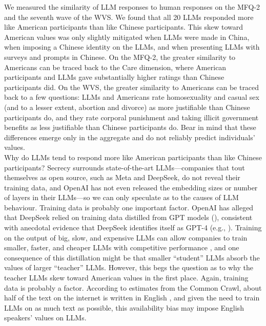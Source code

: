 \documentclass[11pt,a4paper]{article}
\begin{document}
We measured the similarity of LLM responses to human responses on the MFQ-2 and the seventh wave of the WVS. We found that all 20 LLMs responded more like American participants than like Chinese participants. This skew toward American values was only slightly mitigated when LLMs were made in China, when imposing a Chinese identity on the LLMs, and when presenting LLMs with surveys and prompts in Chinese. On the MFQ-2, the greater similarity to Americans can be traced back to the Care dimension, where American participants and LLMs gave substantially higher ratings than Chinese participants did. On the WVS, the greater similarity to Americans can be traced back to a few questions: LLMs and Americans rate homosexuality and casual sex (and to a lesser extent, abortion and divorce) as more justifiable than Chinese participants do, and they rate corporal punishment and taking illicit government benefits as less justifiable than Chinese participants do. Bear in mind that these differences emerge only in the aggregate and do not reliably predict individuals’ values.\\
\indent Why do LLMs tend to respond more like American participants than like Chinese participants? Secrecy surrounds state-of-the-art LLMs---companies that tout themselves as open source, such as Meta and DeepSeek, do not reveal their training data, and OpenAI has not even released the embedding sizes or number of layers in their LLMs---so we can only speculate as to the causes of LLM behaviour. Training data is probably one important factor. OpenAI has alleged that DeepSeek relied on training data distilled from GPT models (\citealp{sweney2025}), consistent with anecdotal evidence that DeepSeek identifies itself as GPT-4 (e.g., \citealp{wiggers2025}). Training on the output of big, slow, and expensive LLMs can allow companies to train smaller, faster, and cheaper LLMs with competitive performance \cite{hsieh2023distilling}, and one consequence of this distillation might be that smaller “student” LLMs absorb the values of larger “teacher” LLMs. However, this begs the question as to why the teacher LLMs skew toward American values in the first place. Again, training data is probably a factor. According to estimates from the Common Crawl, about half of the text on the internet is written in English \cite{commoncrawl}, and given the need to train LLMs on as much text as possible, this availability bias may impose English speakers’ values on LLMs.\\
\end{document}
